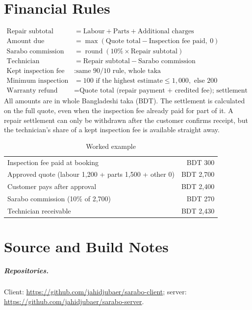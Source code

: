 \documentclass{standalone}
\begin{document}
\chapter{Financial Rules}
\label{app:money}
\begin{align*}
\text{Repair subtotal} &= \text{Labour} + \text{Parts} + \text{Additional charges}\\
\text{Amount due} &= \max(\text{Quote total} - \text{Inspection fee paid},\ 0)\\
\text{Sarabo commission} &= \operatorname{round}(10\% \times \text{Repair subtotal})\\
\text{Technician receivable} &= \text{Repair subtotal} - \text{Sarabo commission}\\
\text{Kept inspection fee} &: \text{same 90/10 rule, whole taka}\\
\text{Minimum inspection fee} &= 100 \text{ if the highest estimate} \le 1{,}000, \text{ else } 200\\
\text{Warranty refund} &= \text{Quote total (repair payment + credited fee); settlement reversed}
\end{align*}
All amounts are in whole Bangladeshi taka (BDT). The settlement is calculated on the full quote, even when the inspection fee already paid for part of it. A repair settlement can only be withdrawn after the customer confirms receipt, but the technician's share of a kept inspection fee is available straight away.

\begin{table}[htbp]
\centering
\caption{Worked example}
\label{tab:moneyexample}
\small
\begin{tabular}{@{}lr@{}}
\toprule
Inspection fee paid at booking & BDT 300 \\
Approved quote (labour 1,200 + parts 1,500 + other 0) & BDT 2,700 \\
Customer pays after approval & BDT 2,400 \\
Sarabo commission (10\% of 2,700) & BDT 270 \\
Technician receivable & BDT 2,430 \\
\bottomrule
\end{tabular}
\end{table}

\chapter{Source and Build Notes}
\label{app:build}
\paragraph*{Repositories.} Client: \url{https://github.com/jahidjubaer/sarabo-client}; server: \url{https://github.com/jahidjubaer/sarabo-server}.
\end{document}
